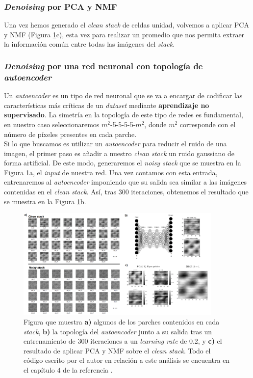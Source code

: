 \subsubsection{\textit{Denoising} por PCA y NMF}

Una vez hemos generado el \textit{clean stack} de celdas unidad, volvemos a aplicar PCA y NMF (Figura \ref{fig:17}c), esta vez para realizar un promedio que nos permita extraer la información común entre todas las imágenes del \textit{stack}.

\subsubsection{\textit{Denoising} por una red neuronal con topología de \textit{autoencoder}}

Un \textit{autoencoder} es un tipo de red neuronal que se va a encargar de codificar las características más críticas de un \textit{dataset} mediante \textbf{aprendizaje no supervisado}. La simetría en la topología de este tipo de redes es fundamental, en nuestro caso seleccionaremos $m^2$-5-5-5-5-$m^2$, donde $m^2$ corresponde con el número de píxeles presentes en cada parche.\\

Si lo que buscamos es utilizar un \textit{autoencoder} para reducir el ruido de una imagen, el primer paso es añadir a nuestro \textit{clean stack} un ruido gaussiano de forma artificial. De este modo, generaremos el \textit{noisy stack} que se muestra en la Figura \ref{fig:17}a, el \textit{input} de nuestra red. Una vez contamos con esta entrada, entrenaremos al \textit{autoencoder} imponiendo que su salida sea similar a las imágenes contenidas en el \textit{clean stack}. Así, tras 300 iteraciones, obtenemos el resultado que se muestra en la Figura \ref{fig:17}b.

\newpage
\begin{figure}[h!]
    \centering
    \includegraphics[width=0.9\textwidth]{fig/Fig17.png}
    \caption{ Figura que muestra \textbf{a)} algunos de los parches contenidos en cada \textit{stack}, \textbf{b)} la topología del \textit{autoencoder} junto a su salida tras un entrenamiento de 300 iteraciones a un \textit{learning rate} de 0.2, y \textbf{c)} el resultado de aplicar PCA y NMF sobre el \textit{clean stack}. Todo el código escrito por el autor en relación a este análisis se encuentra en el capítulo 4 de la referencia \cite{repo}.}
    \label{fig:17}
\end{figure}

